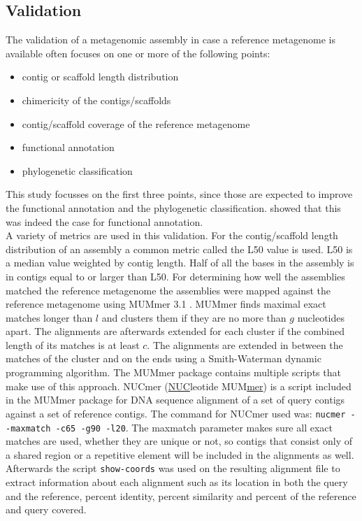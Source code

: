 \documentclass[a4paper,12pt]{article}
\begin{document}

\clearpage \subsection{Validation} \label{sec:metval} The validation of a metagenomic assembly in
case a reference metagenome is available often focuses on one or more of the
following points:
\begin{itemize}
\item contig or scaffold length distribution
\item chimericity of the contigs/scaffolds
\item contig/scaffold coverage of the reference metagenome
\item functional annotation
\item phylogenetic classification
\end{itemize}
This study focusses on the first three points, since those are expected to
improve the functional annotation and the phylogenetic classification.
\citet{Mende22384016} showed that this was indeed the case for functional
annotation.\\


A variety of metrics are used in this validation. For the contig/scaffold
length distribution of an assembly a common metric called the L50 value is
used. L50 is a median value weighted by contig length. Half of all the bases in
the assembly is in contigs equal to or larger than L50. For determining how
well the assemblies matched the reference metagenome the assemblies were mapped
against the reference metagenome using MUMmer 3.1 \cite{Kurtz14759262}.  MUMmer
finds maximal exact matches longer than $l$ and clusters them if they are no
more than $g$ nucleotides apart. The alignments are afterwards extended for
each cluster if the combined length of its matches is at least $c$. The
alignments are extended in between the matches of the cluster and on the ends
using a Smith-Waterman dynamic programming algorithm. The MUMmer package
contains multiple scripts that make use of this approach. NUCmer
(\underline{NUC}leotide MUM\underline{mer}) is a script included in the MUMmer
package for DNA sequence alignment of a set of query contigs against a set of
reference contigs. The command for NUCmer used was: 
\verb!nucmer --maxmatch -c65 -g90 -l20!. The maxmatch parameter makes sure all
exact matches are used, whether they are unique or not, so contigs that consist
only of a shared region or a repetitive element will be included in the
alignments as well. Afterwards the script \verb!show-coords! was used on the
resulting alignment file to extract information about each alignment such as
its location in both the query and the reference, percent identity, percent
similarity and percent of the reference and query covered.\\
\end{document}
